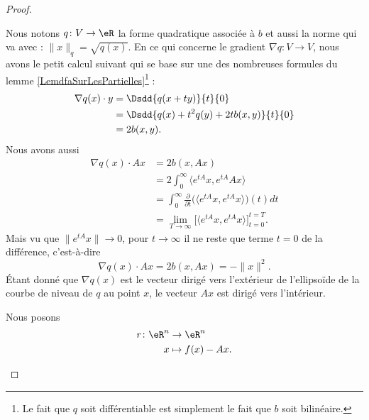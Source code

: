 \begin{proof}
\begin{subproof}
		Nous notons \( q\colon V\to \eR\) la forme quadratique associée à \( b\) et aussi la norme qui va avec : \( \| x \|_q=\sqrt{q(x)}\). En ce qui concerne le gradient \( \nabla q\colon V\to V\), nous avons le petit calcul suivant\cite{MJEooXxBFFY} qui se base sur une des nombreuses formules du lemme \ref{LemdfaSurLesPartielles}\footnote{Le fait que \( q\) soit différentiable est simplement le fait que \( b\) soit bilinéaire.} :
		\begin{subequations}
			\begin{align}
				\nabla q(x)\cdot y & =\Dsdd{ q(x+ty) }{t}{0}               \\
				                   & =\Dsdd{ q(x)+t^2q(y)+2tb(x,y) }{t}{0} \\
				                   & =2b(x,y).
			\end{align}
		\end{subequations}
		Nous avons aussi
		\begin{subequations}
			\begin{align}
				\nabla q(x)\cdot Ax & =2b(x,Ax)                                                                                           \\
				                    & =2\int_0^{\infty}\langle  e^{tA}x,  e^{tA}Ax\rangle                                                 \\
				                    & =\int_0^{\infty}\frac{ \partial  }{ \partial t }\Big( \langle  e^{tA}x,  e^{tA}x\rangle  \Big)(t)dt \\
				                    & =\lim_{T\to \infty} \Big[ \langle  e^{tA}x,  e^{tA}x\rangle  \Big]_{t=0}^{t=T}.
			\end{align}
		\end{subequations}
		Mais vu que \( \|  e^{tA}x \|\to 0\), pour \( t\to \infty\) il ne reste que terme \( t=0\) de la différence, c'est-à-dire
		\begin{equation}    \label{EqUCOGooEFxZSO}
			\nabla q(x)\cdot Ax=2b(x,Ax)=-\| x \|^2.
		\end{equation}
		Étant donné que \( \nabla q(x)\) est le vecteur dirigé vers l'extérieur de l'ellipsoïde de la courbe de niveau de \( q\) au point \( x\), le vecteur \( Ax\) est dirigé vers l'intérieur.

		\begin{center}
			
		\end{center}

		Nous posons
		\begin{equation}
			\begin{aligned}
				r\colon \eR^n & \to \eR^n        \\
				x             & \mapsto f(x)-Ax.
			\end{aligned}
		\end{equation}


\end{subproof}
\end{proof}
